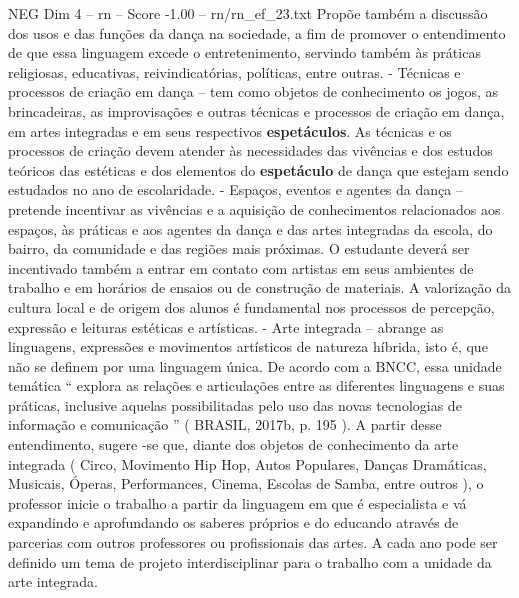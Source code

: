 \begin{textsample}{NEG Dim 4 – rn – Score -1.00 – rn/rn\_ef\_23.txt}
Propõe também a discussão dos usos e das funções da dança na sociedade, a fim de promover o entendimento de que essa linguagem excede o entretenimento, servindo também às práticas religiosas, educativas, reivindicatórias, políticas, entre outras. - Técnicas e processos de criação em dança – tem como objetos de conhecimento os jogos, as brincadeiras, as improvisações e outras técnicas e processos de criação em dança, em artes integradas e em seus respectivos \textbf{espetáculos}.
As técnicas e os processos de criação devem atender às necessidades das vivências e dos estudos teóricos das estéticas e dos elementos do \textbf{espetáculo} de dança que estejam sendo estudados no ano de escolaridade. - Espaços, eventos e agentes da dança – pretende incentivar as vivências e a aquisição de conhecimentos relacionados aos espaços, às práticas e aos agentes da dança e das artes integradas da escola, do bairro, da comunidade e das regiões mais próximas.
O estudante deverá ser incentivado também a entrar em contato com artistas em seus ambientes de trabalho e em horários de ensaios ou de construção de materiais.
A valorização da cultura local e de origem dos alunos é fundamental nos processos de percepção, expressão e leituras estéticas e artísticas. - Arte integrada – abrange as linguagens, expressões e movimentos artísticos de natureza híbrida, isto é, que não se definem por uma linguagem única.
De acordo com a BNCC, essa unidade temática “ explora as relações e articulações entre as diferentes linguagens e suas práticas, inclusive aquelas possibilitadas pelo uso das novas tecnologias de informação e comunicação ” ( BRASIL, 2017b, p. 195 ).
A partir desse entendimento, sugere -se que, diante dos objetos de conhecimento da arte integrada ( Circo, Movimento Hip Hop, Autos Populares, Danças Dramáticas, Musicais, Óperas, Performances, Cinema, Escolas de Samba, entre outros ), o professor inicie o trabalho a partir da linguagem em que é especialista e vá expandindo e aprofundando os saberes próprios e do educando através de parcerias com outros professores ou profissionais das artes.
A cada ano pode ser definido um tema de projeto interdisciplinar para o trabalho com a unidade da arte integrada.

\end{textsample}
